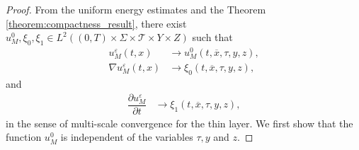 \documentclass[11pt]{article}
\def\es{\varepsilon}
\def\T{\mathcal{T}}
\begin{document}
    \begin{proof}
           From the uniform energy estimates and the Theorem \ref{theorem:compactness_result}, there exist $u_M^0,\xi_0,\xi_1\in L^2((0,T)\times \Sigma\times \T\times Y\times Z)$ such that
        \begin{align*}
            u_M^\es(t,x)&\longrightarrow u_M^0(t,\overline{x},\tau,y,z),\\
        \nabla u_M^\es(t,x)&\longrightarrow \xi_0(t,\overline{x},\tau,y,z),
        \end{align*}
        and
        \begin{align*}
        \dfrac{\partial u_M^\es}{\partial t}&\longrightarrow  \xi_1(t,\overline{x},\tau,y,z),
        \end{align*}
        in the sense of multi-scale convergence for the thin layer. We first show that the function $u_M^0$ is independent of the variables $\tau,y$ and $z$. 
        

\end{proof}
\end{document}

